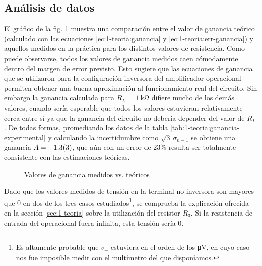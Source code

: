 \subsection{Análisis de datos}

El gráfico de la fig. \ref{fig:1-analisis:ganancia} muestra una comparación
entre el valor de ganancia teórico (calculado con las ecuaciones 
\ref{ec:1-teoria:ganancia} y \ref{ec:1-teoria:err-ganancia}) y aquellos 
medidos en la práctica para los distintos valores de resistencia. Como puede
observarse, todos los valores de ganancia medidos caen cómodamente dentro
del margen de error previsto. Esto sugiere que las ecuaciones de ganancia
que se utilizaron para la configuración inversora del amplificador operacional
permiten obtener una buena aproximación al funcionamiento real del circuito.
Sin embargo la ganancia calculada para $R_L = \SI{1}{\kilo\ohm}$ difiere mucho
de los demás valores, cuando sería esperable que todos los valores estuvieran
relativamente cerca entre sí ya que la ganancia del circuito no debería
depender del valor de $R_L$. De todas formas, promediando los datos de la tabla
\ref{tab:1-teoria:ganancia-experimental} y calculando la incertidumbre como
$\sqrt{3}\,\sigma_{n-1}$ se obtiene una ganancia
$A = \num{-1.3 \pm 0.3}$, que aún con un error de $23\%$ resulta ser 
totalmente consistente con las estimaciones teóricas.

\begin{figure}[H]
    \centering
    
    \caption{Valores de ganancia medidos vs. teóricos}
    \label{fig:1-analisis:ganancia}
\end{figure}

Dado que los valores medidos de tensión en la terminal no inversora son
mayores que $0$ en dos de los tres casos estudiados\footnote{Es altamente
probable que $v_+$ estuviera en el orden de los \si{\micro\volt}, en cuyo
caso nos fue imposible medir con el multímetro del que disponíamos.}, se
comprueba la explicación ofrecida en la sección \ref{sec:1-teoria} sobre la
utilización del resistor $R_3$. Si la resistencia de entrada del operacional
fuera infinita, esta tensión sería 0.

